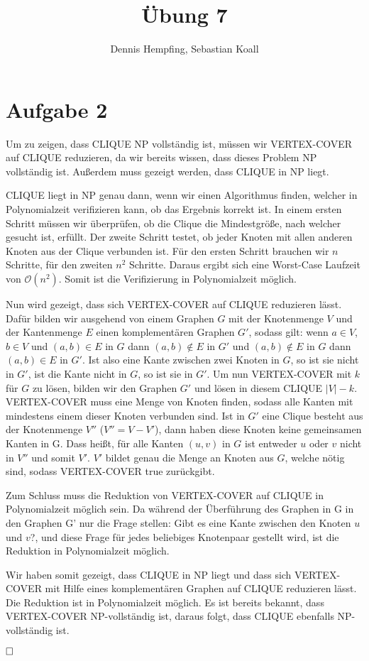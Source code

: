 \documentclass[12pt]{scrartcl}%
\theoremstyle{nonumberplain}
\newcommand{\bO}[1]{\mathcal O(#1)}
\begin{document}
\author{Dennis Hempfing, Sebastian Koall}
\title{Übung 7}
\date{} 
\pagestyle{myheadings}

\maketitle %

\section*{Aufgabe 2}
Um zu zeigen, dass CLIQUE NP vollständig ist, müssen wir VERTEX-COVER auf CLIQUE reduzieren, da wir bereits wissen, dass dieses Problem NP vollständig ist. Außerdem muss gezeigt werden, dass CLIQUE in NP liegt.

CLIQUE liegt in NP genau dann, wenn wir einen Algorithmus finden, welcher in Polynomialzeit verifizieren kann, ob das Ergebnis korrekt ist. In einem ersten Schritt müssen wir überprüfen, ob die Clique die Mindestgröße, nach welcher gesucht ist, erfüllt. Der zweite Schritt testet, ob jeder Knoten mit allen anderen Knoten aus der Clique verbunden ist. Für den ersten Schritt brauchen wir $n$ Schritte, für den zweiten $n^2$ Schritte. Daraus ergibt sich eine Worst-Case Laufzeit von $\bO{n^2}$. Somit ist die Verifizierung in Polynomialzeit möglich.

Nun wird gezeigt, dass sich VERTEX-COVER auf CLIQUE reduzieren lässt. Dafür bilden wir ausgehend von einem Graphen $G$ mit der Knotenmenge $V$ und der Kantenmenge $E$ einen komplementären Graphen $G'$, sodass gilt: wenn $a \in V$, $b \in V$ und $(a,b) \in E$ in $G$ dann $(a,b) \notin E$ in $G'$ und $(a,b) \notin E$ in $G$ dann $(a,b) \in E$ in $G'$. Ist also eine Kante zwischen zwei Knoten in $G$, so ist sie nicht in $G'$, ist die Kante nicht in $G$, so ist sie in $G'$. Um nun VERTEX-COVER mit $k$ für $G$ zu lösen, bilden wir den Graphen $G'$ und lösen in diesem CLIQUE $|V| - k$. VERTEX-COVER muss eine Menge von Knoten finden, sodass alle Kanten mit mindestens einem dieser Knoten verbunden sind. Ist in $G'$ eine Clique besteht aus der Knotenmenge $V''$ ($V'' = V - V'$), dann haben diese Knoten keine gemeinsamen Kanten in G. Dass heißt, für alle Kanten $(u,v)$ in $G$ ist entweder $u$ oder $v$ nicht in $V''$ und somit $V'$. $V'$ bildet genau die Menge an Knoten aus $G$, welche nötig sind, sodass VERTEX-COVER true zurückgibt.

Zum Schluss muss die Reduktion von VERTEX-COVER auf CLIQUE in Polynomialzeit möglich sein. Da während der Überführung des Graphen in G in den Graphen G' nur die Frage stellen: Gibt es eine Kante zwischen den Knoten $u$ und $v$?, und diese Frage für jedes beliebiges Knotenpaar gestellt wird, ist die Reduktion in Polynomialzeit möglich.

Wir haben somit gezeigt, dass CLIQUE in NP liegt und dass sich VERTEX-COVER mit Hilfe eines komplementären Graphen auf CLIQUE reduzieren lässt. Die Reduktion ist in Polynomialzeit möglich. Es ist bereits bekannt, dass VERTEX-COVER NP-vollständig ist, daraus folgt, dass CLIQUE ebenfalls NP-vollständig ist.

$\hfill \square$ 
\end{document}
